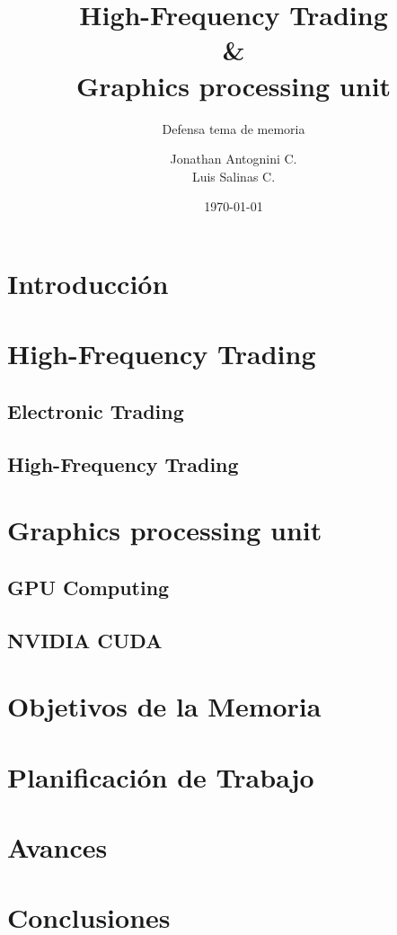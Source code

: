 \documentclass{beamer}
\title{High-Frequency Trading \\ \& \\ Graphics processing unit}
\subtitle{Defensa tema de memoria}
\author{Jonathan Antognini C.\\
		Luis Salinas C.}
\institute[]{Universidad Técnica Federico Santa María}
\date{\today}
\begin{document}
    \frame{\titlepage}
    \frame{\tableofcontents}
	\section{Introducción}
		
	\section{High-Frequency Trading}
		
		\subsection{Electronic Trading}
			
		\subsection{High-Frequency Trading}
			
	\section{Graphics processing unit}
		
		\subsection{GPU Computing}
			
		\subsection{NVIDIA CUDA}
			
	\section{Objetivos de la Memoria}
		
	\section{Planificación de Trabajo}
		
	\section{Avances}
		
	\section{Conclusiones}
		
	
\end{document}
